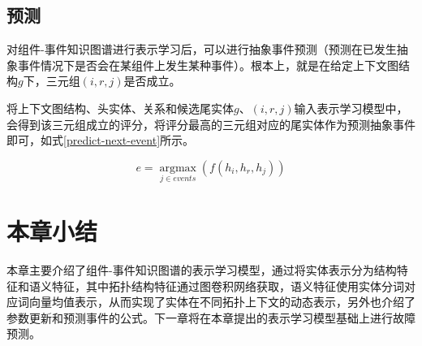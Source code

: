 \subsection{预测}
对组件-事件知识图谱进行表示学习后，可以进行抽象事件预测（预测在已发生抽象事件情况下是否会在某组件上发生某种事件）。根本上，就是在给定上下文图结构$g$下，三元组$(i, r, j)$是否成立。

将上下文图结构、头实体、关系和候选尾实体$g$、$(i, r, j)$输入表示学习模型中，会得到该三元组成立的评分，将评分最高的三元组对应的尾实体作为预测抽象事件即可，如式\ref{predict-next-event}所示。

\begin{equation}
    e = \mathop{\arg\max}\limits_{j\in events}( f (h_i, h_r, h_j)) 
    \label{predict-next-event}   
\end{equation}


\section{本章小结}
本章主要介绍了组件-事件知识图谱的表示学习模型，通过将实体表示分为结构特征和语义特征，其中拓扑结构特征通过图卷积网络获取，语义特征使用实体分词对应词向量均值表示，从而实现了实体在不同拓扑上下文的动态表示，另外也介绍了参数更新和预测事件的公式。下一章将在本章提出的表示学习模型基础上进行故障预测。






